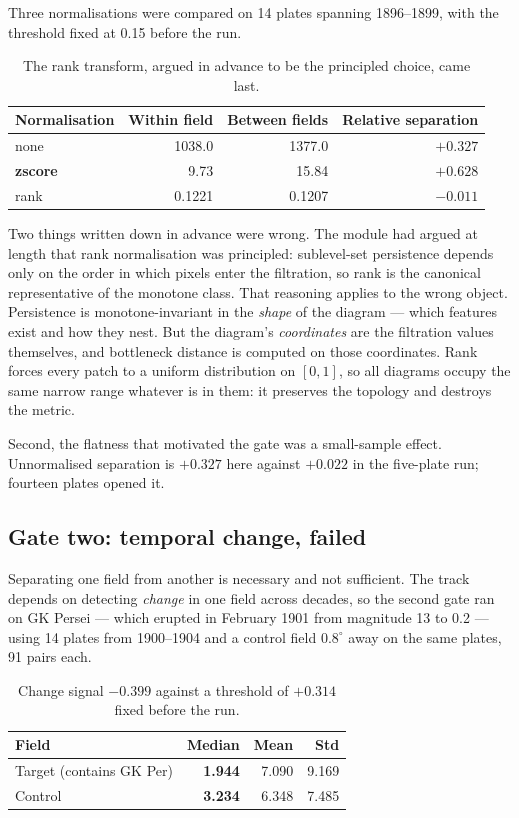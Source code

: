 \documentclass[11pt,a4paper]{report}
\begin{document}
Three normalisations were compared on 14 plates spanning 1896--1899, with the threshold fixed
at 0.15 before the run.

\begin{table}[h]
\centering
\small
\begin{tabular}{lrrr}
\toprule
Normalisation & Within field & Between fields & Relative separation \\
\midrule
none & 1038.0 & 1377.0 & $+0.327$ \\
\textbf{zscore} & 9.73 & 15.84 & $\mathbf{+0.628}$ \\
rank & 0.1221 & 0.1207 & $\mathbf{-0.011}$ \\
\bottomrule
\end{tabular}
\caption{The rank transform, argued in advance to be the principled choice, came last.}
\end{table}

Two things written down in advance were wrong. The module had argued at length that rank
normalisation was principled: sublevel-set persistence depends only on the order in which
pixels enter the filtration, so rank is the canonical representative of the monotone class.
That reasoning applies to the wrong object. Persistence is monotone-invariant in the
\emph{shape} of the diagram --- which features exist and how they nest. But the diagram's
\emph{coordinates} are the filtration values themselves, and bottleneck distance is computed
on those coordinates. Rank forces every patch to a uniform distribution on $[0,1]$, so all
diagrams occupy the same narrow range whatever is in them: it preserves the topology and
destroys the metric.

Second, the flatness that motivated the gate was a small-sample effect. Unnormalised
separation is $+0.327$ here against $+0.022$ in the five-plate run; fourteen plates opened it.

\subsection{Gate two: temporal change, failed}

Separating one field from another is necessary and not sufficient. The track depends on
detecting \emph{change} in one field across decades, so the second gate ran on GK Persei ---
which erupted in February 1901 from magnitude 13 to 0.2 --- using 14 plates from 1900--1904
and a control field $0.8^\circ$ away on the same plates, 91 pairs each.

\begin{table}[h]
\centering
\small
\begin{tabular}{lrrr}
\toprule
Field & Median & Mean & Std \\
\midrule
Target (contains GK Per) & \textbf{1.944} & 7.090 & 9.169 \\
Control & \textbf{3.234} & 6.348 & 7.485 \\
\bottomrule
\end{tabular}
\caption{Change signal $-0.399$ against a threshold of $+0.314$ fixed before the run.}
\end{table}
\end{document}
